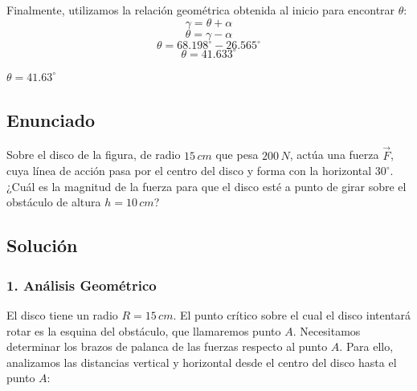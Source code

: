 \documentclass[12pt, a4paper]{article}
\begin{document}
Finalmente, utilizamos la relación geométrica obtenida al inicio para encontrar $\theta$:
$$\gamma = \theta + \alpha$$
$$\theta = \gamma - \alpha$$
$$\theta = 68.198^\circ - 26.565^\circ$$
$$\theta = 41.633^\circ$$

\begin{tcolorbox}[colback=green!5!white, colframe=green!50!black, title=Respuesta Final]
\centering \Large $\theta = 41.63^\circ$
\end{tcolorbox}

\newpage

\subsection*{Enunciado}
Sobre el disco de la figura, de radio $15 \, \si{cm}$ que pesa $200 \, \si{N}$, actúa una fuerza $\vec{F}$, cuya línea de acción pasa por el centro del disco y forma con la horizontal $30^\circ$. ¿Cuál es la magnitud de la fuerza para que el disco esté a punto de girar sobre el obstáculo de altura $h = 10 \, \si{cm}$?

\begin{center}
\end{center}

\subsection*{Solución}

\subsubsection*{1. Análisis Geométrico}
El disco tiene un radio $R = 15 \, \si{cm}$. El punto crítico sobre el cual el disco intentará rotar es la esquina del obstáculo, que llamaremos punto $A$.
Necesitamos determinar los brazos de palanca de las fuerzas respecto al punto $A$. Para ello, analizamos las distancias vertical y horizontal desde el centro del disco hasta el punto $A$:
\end{document}
